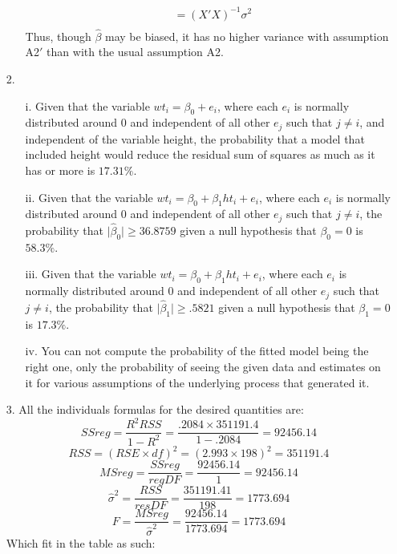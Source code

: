 \documentclass[11pt]{article}
\theoremstyle{definition}
\begin{document}
\begin{itemize}
\begin{itemize}
\begin{align*}
                                               &= (X'X)^{-1}\sigma^2 \\
                \end{align*}
                Thus, though $\hat{\beta}$ may be biased, it has no higher variance with assumption A2$'$ than with the usual assumption A2.
        \end{itemize}
    \item[2.]
        \begin{itemize}
            \item[i.]
                Given that the variable \(wt_i = \beta_0 + e_i\), where each $e_i$ is normally distributed around $0$ and independent of all other $e_j$ such that $j\neq i$, and independent of the variable height, the probability that a model that included height would reduce the residual sum of squares as much as it has or more is $17.31\%$.
            \item[ii.]
                Given that the variable \(wt_i = \beta_0 + \beta_1 ht_i + e_i\), where each $e_i$ is normally distributed around $0$ and independent of all other $e_j$ such that $j\neq i$, the probability that \(\vert \hat\beta_0 \vert \geq 36.8759 \) given a null hypothesis that \(\beta_0=0\) is $58.3\%$.
           \item[iii.]
               Given that the variable \(wt_i = \beta_0 + \beta_1 ht_i + e_i\), where each $e_i$ is normally distributed around $0$ and independent of all other $e_j$ such that $j\neq i$, the probability that \(\vert \hat\beta_1 \vert \geq .5821  \) given a null hypothesis that \(\beta_1=0\) is $17.3\%$.
            \item[iv.]
                You can not compute the probability of the fitted model being the right one, only the probability of seeing the given data and estimates on it for various assumptions of the underlying process that generated it.
        \end{itemize}
    \item[3.]
        All the individuals formulas for the desired quantities are: \\
        \[SSreg = \frac{R^2 RSS}{1 - R^2}= \frac{.2084 \times 351191.4}{1-.2084}=92456.14\]
        \[RSS=(RSE \times df)^2=(2.993 \times 198)^2=351191.4\]
        \[MSreg = \frac{SSreg}{regDF} = \frac{92456.14}{1}= 92456.14\]
        \[\hat\sigma^2 = \frac{RSS}{resDF} = \frac{351191.41}{198} = 1773.694\]
        \[F = \frac{MSreg}{\hat\sigma^2} = \frac{92456.14}{1773.694} = 1773.694 \]
        Which fit in the table as such: \\

\end{itemize}
\end{document}
